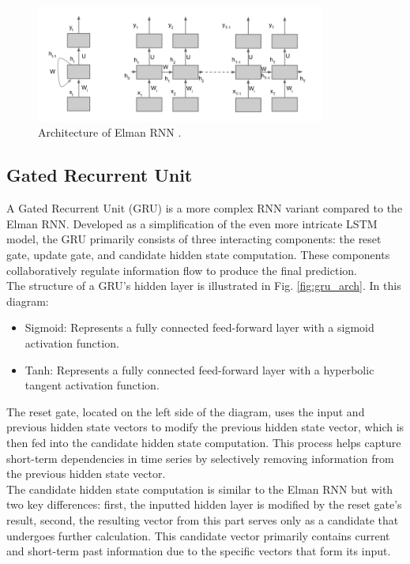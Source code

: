 \begin{figure}[!h]
	\centering
	
	\includegraphics[width=0.85\textwidth]{images/Elman_RNN_architecture.png}
	
	\caption{Architecture of Elman RNN \cite{elman_img}.}
	\label{fig:elman_arch}
\end{figure}

\subsection{Gated Recurrent Unit}

A Gated Recurrent Unit (GRU) is a more complex RNN variant compared to the Elman RNN. Developed as a simplification of the even more intricate LSTM model, the GRU primarily consists of three interacting components: the reset gate, update gate, and candidate hidden state computation. These components collaboratively regulate information flow to produce the final prediction.
\\

The structure of a GRU’s hidden layer is illustrated in Fig. \ref{fig:gru_arch}. In this diagram:

\begin{itemize}
	\item Sigmoid: Represents a fully connected feed-forward layer with a sigmoid activation function.
	\item Tanh: Represents a fully connected feed-forward layer with a hyperbolic tangent activation function.
\end{itemize}

The reset gate, located on the left side of the diagram, uses the input and previous hidden state vectors to modify the previous hidden state vector, which is then fed into the candidate hidden state computation. This process helps capture short-term dependencies in time series by selectively removing information from the previous hidden state vector.
\\

The candidate hidden state computation is similar to the Elman RNN but with two key differences: first, the inputted hidden layer is modified by the reset gate's result, second, the resulting vector from this part serves only as a candidate that undergoes further calculation. This candidate vector primarily contains current and short-term past information due to the specific vectors that form its input.
\\

